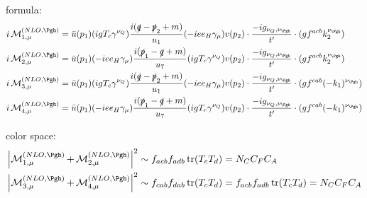 formula:
\begin{align}
i\Md^{(NLO,\Pgh)}_{1,\mu} &= \bar u(p_1)( igT_c\gamma^{\nu_Q})\frac{i(\slashed{q}-\slashed{p}_2+m)}{u_1}(-i e e_H \gamma_\mu) v(p_2)\cdot\frac{-ig_{\nu_Q,\nu_{\Pgh}}}{t'} \cdot (gf^{acb}k_2^{\nu_{\Pgh}})\\
i\Md^{(NLO,\Pgh)}_{2,\mu} &= \bar u(p_1)(-i e e_H \gamma_\mu) \frac{i(\slashed{p}_1-\slashed{q}+m)}{u_7}( igT_c\gamma^{\nu_Q})v(p_2)\cdot\frac{-ig_{\nu_Q,\nu_{\Pgh}}}{t'} \cdot (gf^{acb}k_2^{\nu_{\Pgh}})\\
i\Md^{(NLO,\Pgh)}_{3,\mu} &= \bar u(p_1)( igT_c\gamma^{\nu_Q})\frac{i(\slashed{q}-\slashed{p}_2+m)}{u_1}(-i e e_H \gamma_\mu) v(p_2)\cdot\frac{-ig_{\nu_Q,\nu_{\Pgh}}}{t'} \cdot (gf^{cab}(-k_1)^{\nu_{\Pgh}})\\
i\Md^{(NLO,\Pgh)}_{4,\mu} &= \bar u(p_1)(-i e e_H \gamma_\mu) \frac{i(\slashed{p}_1-\slashed{q}+m)}{u_7}(igT_c\gamma^{\nu_Q})v(p_2)\cdot\frac{-ig_{\nu_Q,\nu_{\Pgh}}}{t'} \cdot (gf^{cab}(-k_1)^{\nu_{\Pgh}})
\end{align}

color space:
\begin{align}
\abs{\Md^{(NLO,\Pgh)}_{1,\mu}+\Md^{(NLO,\Pgh)}_{2,\mu}}^2 &\sim f_{acb}f_{adb}\tr(T_cT_d) = N_C C_F C_A\\
\abs{\Md^{(NLO,\Pgh)}_{3,\mu}+\Md^{(NLO,\Pgh)}_{4,\mu}}^2 &\sim f_{cab}f_{dab}\tr(T_c T_d) = f_{acb}f_{adb}\tr(T_cT_d) = N_C C_F C_A
\end{align}
